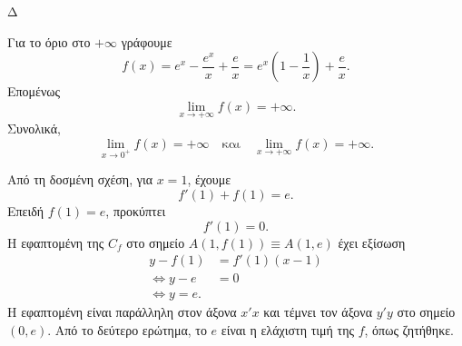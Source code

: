 \begin{thema}{Δ}
\begin{erwthma}
Για το όριο στο $+\infty$ γράφουμε
\[
f(x)=e^x-\frac{e^x}{x}+\frac{e}{x}
=e^x\left(1-\frac{1}{x}\right)+\frac{e}{x}.
\]
Επομένως
\[
{\lim_{x\to+\infty}f(x)=+\infty}.
\]
Συνολικά,
\[
{\lim_{x\to0^+}f(x)=+\infty
\quad\text{και}\quad
\lim_{x\to+\infty}f(x)=+\infty}.
\]

\item Από τη δοσμένη σχέση, για $x=1$, έχουμε
\[
f'(1)+f(1)=e.
\]
Επειδή $f(1)=e$, προκύπτει
\[
f'(1)=0.
\]
Η εφαπτομένη της $C_f$ στο σημείο $A(1,f(1))\equiv A(1,e)$ έχει εξίσωση
\begin{align*}
y-f(1)&=f'(1)(x-1)\\
\Leftrightarrow y-e&=0\\
\Leftrightarrow {y=e}.
\end{align*}
Η εφαπτομένη είναι παράλληλη στον άξονα $x'x$ και τέμνει τον άξονα $y'y$ στο σημείο $(0,e)$. Από το δεύτερο ερώτημα, το $e$ είναι η ελάχιστη τιμή της $f$, όπως ζητήθηκε.
\end{erwthma}
\end{thema}

